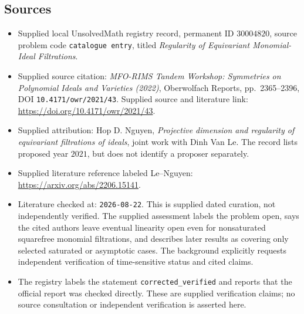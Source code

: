 \documentclass[11pt]{article}
\begin{document}
\subsection{Sources}
\begin{itemize}
\item Supplied local UnsolvedMath registry record, permanent ID \(30004820\), source problem code \texttt{catalogue entry}, titled \emph{Regularity of Equivariant Monomial-Ideal Filtrations}.
\item Supplied source citation: \emph{MFO-RIMS Tandem Workshop: Symmetries on Polynomial Ideals and Varieties (2022)}, Oberwolfach Reports, pp.~2365--2396, DOI \texttt{10.4171/owr/2021/43}. Supplied source and literature link: \url{https://doi.org/10.4171/owr/2021/43}.
\item Supplied attribution: Hop D. Nguyen, \emph{Projective dimension and regularity of equivariant filtrations of ideals}, joint work with Dinh Van Le. The record lists proposed year \(2021\), but does not identify a proposer separately.
\item Supplied literature reference labeled Le--Nguyen: \url{https://arxiv.org/abs/2206.15141}.
\item Literature checked at: \texttt{2026-08-22}. This is supplied dated curation, not independently verified. The supplied assessment labels the problem open, says the cited authors leave eventual linearity open even for nonsaturated squarefree monomial filtrations, and describes later results as covering only selected saturated or asymptotic cases. The background explicitly requests independent verification of time-sensitive status and cited claims.
\item The registry labels the statement \texttt{corrected\_verified} and reports that the official report was checked directly. These are supplied verification claims; no source consultation or independent verification is asserted here.
\end{itemize}
\end{document}
